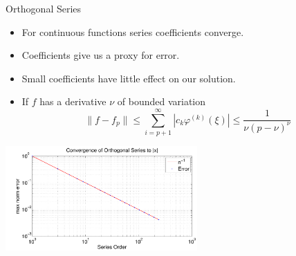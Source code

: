 \documentclass[sansserif]{beamer}
\begin{document}
\begin{frame}{Orthogonal Series}
\begin{itemize}
  \item<1-> For continuous functions series coefficients converge.
 \item<1-> Coefficients give us a proxy for error.
 \item<2-> Small coefficients have little effect on our solution.
  \item<3-> If $f$ has a derivative $\nu$ of bounded variation 
 \vspace{0 cm}
 {\scriptsize$$\|f-f_p\|\le \sum_{i=p+1}^\infty |c_k \varphi^{(k)}(\xi)| \le \frac{1}{\nu (p-\nu)^{\nu}}$$}
\end{itemize}
 \vspace{-0.5 cm}
\begin{center}
\includegraphics[height=40mm]{decayrate}
\end{center} 

\end{frame}
\end{document}
